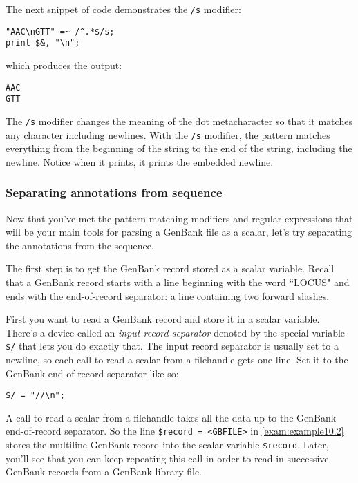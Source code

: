 The next snippet of code demonstrates the \verb|/s| modifier:

\begin{lstlisting}
"AAC\nGTT" =~ /^.*$/s;
print $&, "\n";
\end{lstlisting}

which produces the output:

\begin{lstlisting}
AAC
GTT
\end{lstlisting}

The \verb|/s| modifier changes the meaning of the dot metacharacter so that it matches any character including newlines. With the \verb|/s| modifier, the pattern matches everything from the beginning of the string to the end of the string, including the newline. Notice when it prints, it prints the embedded newline.

\subsubsection{Separating annotations from sequence}
Now that you've met the pattern-matching modifiers and regular expressions that will be your main tools for parsing a GenBank file as a scalar, let's try separating the annotations from the sequence.

The first step is to get the GenBank record stored as a scalar variable. Recall that a GenBank record starts with a line beginning with the word ``LOCUS" and ends with the end-of-record separator: a line containing two forward slashes.

First you want to read a GenBank record and store it in a scalar variable. There's a device called an \textit{input record separator} denoted by the special variable \verb|$/| that lets you do exactly that. The input record separator is usually set to a newline, so each call to read a scalar from a filehandle gets one line. Set it to the GenBank end-of-record separator like so:

\begin{lstlisting}
$/ = "//\n";
\end{lstlisting}

A call to read a scalar from a filehandle takes all the data up to the GenBank end-of-record separator. So the line \verb|$record = <GBFILE>| in \autoref{exam:example10.2} stores the multiline GenBank record into the scalar variable \verb|$record|. Later, you'll see that you can keep repeating this call in order to read in successive GenBank records from a GenBank library file.

